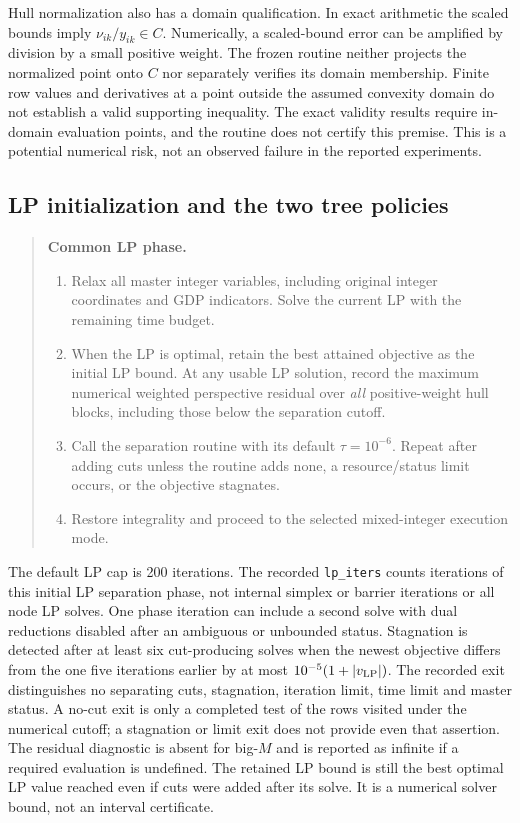 Hull normalization also has a domain qualification. In exact arithmetic the scaled bounds imply $\nu_{ik}/y_{ik}\in C$. Numerically, a scaled-bound error can be amplified by division by a small positive weight. The frozen routine neither projects the normalized point onto $C$ nor separately verifies its domain membership. Finite row values and derivatives at a point outside the assumed convexity domain do not establish a valid supporting inequality. The exact validity results require in-domain evaluation points, and the routine does not certify this premise. This is a potential numerical risk, not an observed failure in the reported experiments.

\subsection{LP initialization and the two tree policies}
\begin{quote}
\textbf{Common LP phase.}
\begin{enumerate}
 \item Relax all master integer variables, including original integer coordinates and GDP indicators. Solve the current LP with the remaining time budget.
 \item When the LP is optimal, retain the best attained objective as the initial LP bound. At any usable LP solution, record the maximum numerical weighted perspective residual over \emph{all} positive-weight hull blocks, including those below the separation cutoff.
 \item Call the separation routine with its default $\tau=10^{-6}$. Repeat after adding cuts unless the routine adds none, a resource/status limit occurs, or the objective stagnates.
 \item Restore integrality and proceed to the selected mixed-integer execution mode.
\end{enumerate}
\end{quote}
The default LP cap is 200 iterations. The recorded \texttt{lp\_iters} counts iterations of this initial LP separation phase, not internal simplex or barrier iterations or all node LP solves. One phase iteration can include a second solve with dual reductions disabled after an ambiguous or unbounded status. Stagnation is detected after at least six cut-producing solves when the newest objective differs from the one five iterations earlier by at most $10^{-5}(1+|v_{\rm LP}|)$. The recorded exit distinguishes no separating cuts, stagnation, iteration limit, time limit and master status. A no-cut exit is only a completed test of the rows visited under the numerical cutoff; a stagnation or limit exit does not provide even that assertion. The residual diagnostic is absent for big-$M$ and is reported as infinite if a required evaluation is undefined. The retained LP bound is still the best optimal LP value reached even if cuts were added after its solve. It is a numerical solver bound, not an interval certificate.

